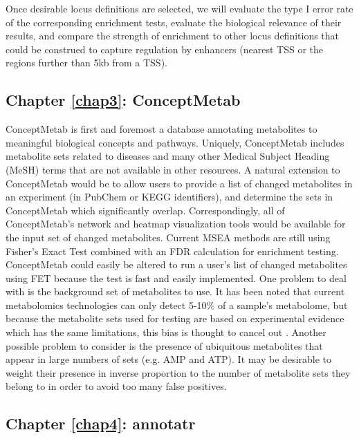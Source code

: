 Once desirable locus definitions are selected, we will evaluate the type I error rate of the corresponding enrichment tests, evaluate the biological relevance of their results, and compare the strength of enrichment to other locus definitions that could be construed to capture regulation by enhancers (nearest TSS or the regions further than 5kb from a TSS).

\subsection{Chapter \ref{chap3}: ConceptMetab}
\label{conceptmetab_conclusion}

ConceptMetab is first and foremost a database annotating metabolites to meaningful biological concepts and pathways. Uniquely, ConceptMetab includes metabolite sets related to diseases and many other Medical Subject Heading (MeSH) terms that are not available in other resources. A natural extension to ConceptMetab would be to allow users to provide a list of changed metabolites in an experiment (in PubChem or KEGG identifiers), and determine the sets in ConceptMetab which significantly overlap. Correspondingly, all of ConceptMetab's network and heatmap visualization tools would be available for the input set of changed metabolites. Current MSEA methods are still using Fisher's Exact Test \cite{LpezIbez:2016bt} combined with an FDR calculation for enrichment testing. ConceptMetab could easily be altered to run a user's list of changed metabolites using FET because the test is fast and easily implemented. One problem to deal with is the background set of metabolites to use. It has been noted that current metabolomics technologies can only detect 5-10\% of a sample's metabolome, but because the metabolite sets used for testing are based on experimental evidence which has the same limitations, this bias is thought to cancel out \cite{Xia:2010fv}. Another possible problem to consider is the presence of ubiquitous metabolites that appear in large numbers of sets (e.g. AMP and ATP). It may be desirable to weight their presence in inverse proportion to the number of metabolite sets they belong to in order to avoid too many false positives.

\subsection{Chapter \ref{chap4}: annotatr}
\label{annotatr_conclusion}

